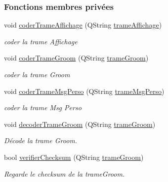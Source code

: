 \subsubsection*{Fonctions membres privées}
\begin{DoxyCompactItemize}
\item 
void \hyperlink{class_controle_a316808279226b01ac8fe51ab396b1b67}{coder\+Trame\+Affichage} (Q\+String \hyperlink{class_controle_a0bbdd7a0c44fbbc45bf3a381872fcfbe}{trame\+Affichage})
\begin{DoxyCompactList}\small\item\em coder la trame Affichage \end{DoxyCompactList}\item 
void \hyperlink{class_controle_a9ba8efd42493ffd4288537a1ace4e220}{coder\+Trame\+Groom} (Q\+String \hyperlink{class_controle_a5b9512ebbaf16746f55a9519de88f9be}{trame\+Groom})
\begin{DoxyCompactList}\small\item\em coder la trame Groom \end{DoxyCompactList}\item 
void \hyperlink{class_controle_a77d635484c2e6fca851d40e76f422fce}{coder\+Trame\+Msg\+Perso} (Q\+String \hyperlink{class_controle_a5cb6dbeb8b2f066b1e757f3c933ea503}{trame\+Msg\+Perso})
\begin{DoxyCompactList}\small\item\em coder la trame Msg Perso \end{DoxyCompactList}\item 
void \hyperlink{class_controle_a2dcdd01e67e6ce8769188d62ce0c262a}{decoder\+Trame\+Groom} (Q\+String \hyperlink{class_controle_a5b9512ebbaf16746f55a9519de88f9be}{trame\+Groom})
\begin{DoxyCompactList}\small\item\em Décode la trame Groom. \end{DoxyCompactList}\item 
bool \hyperlink{class_controle_a4f40023a18e4e656282a15d5657e0a25}{verifier\+Checksum} (Q\+String \hyperlink{class_controle_a5b9512ebbaf16746f55a9519de88f9be}{trame\+Groom})
\begin{DoxyCompactList}\small\item\em Regarde le checksum de la trame\+Groom. \end{DoxyCompactList}\end{DoxyCompactItemize}
